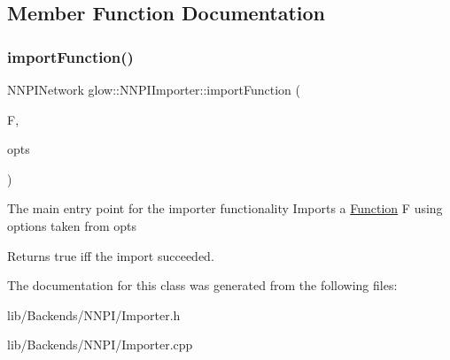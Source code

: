 \subsection{Member Function Documentation}
\mbox{\label{classglow_1_1_n_n_p_i_importer_acee7ca1b564e19778f18da94739bb8f1}} 
\subsubsection{\texorpdfstring{import\+Function()}{importFunction()}}
{\footnotesize\ttfamily N\+N\+P\+I\+Network glow\+::\+N\+N\+P\+I\+Importer\+::import\+Function (\begin{DoxyParamCaption}\item[{\hyperlink{classglow_1_1_function}{Function} $\ast$}]{F,  }\item[{const \hyperlink{structglow_1_1_backend_options}{Backend\+Options} \&}]{opts }\end{DoxyParamCaption})}

The main entry point for the importer functionality Imports a \hyperlink{classglow_1_1_function}{Function} {\ttfamily F} using options taken from {\ttfamily opts} \begin{DoxyReturn}{Returns}
true iff the import succeeded. 
\end{DoxyReturn}


The documentation for this class was generated from the following files\+:\begin{DoxyCompactItemize}
\item 
lib/\+Backends/\+N\+N\+P\+I/Importer.\+h\item 
lib/\+Backends/\+N\+N\+P\+I/Importer.\+cpp\end{DoxyCompactItemize}
